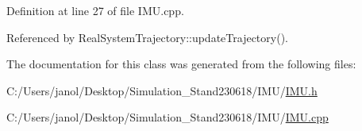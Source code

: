 Definition at line 27 of file I\+M\+U.\+cpp.



Referenced by Real\+System\+Trajectory\+::update\+Trajectory().



The documentation for this class was generated from the following files\+:\begin{DoxyCompactItemize}
\item 
C\+:/\+Users/janol/\+Desktop/\+Simulation\+\_\+\+Stand230618/\+I\+M\+U/\hyperlink{_i_m_u_8h}{I\+M\+U.\+h}\item 
C\+:/\+Users/janol/\+Desktop/\+Simulation\+\_\+\+Stand230618/\+I\+M\+U/\hyperlink{_i_m_u_8cpp}{I\+M\+U.\+cpp}\end{DoxyCompactItemize}
